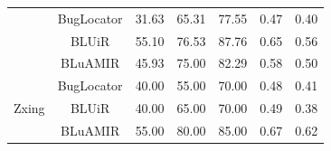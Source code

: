 \documentclass[conference]{IEEEtran}
\begin{document}
\begin{table}[htbp]
{\begin{tabular}{c|c|c|c|c|c|c}
			       & BugLocator & 31.63 & 65.31 & 77.55 & 0.47 & 0.40 \\  \cline{2-7} 
			       & BLUiR & 55.10 & 76.53 & 87.76 & 0.65  & 0.56 \\  \cline{2-7} &BLuAMIR                                                                     & 45.93                                               & 75.00                                              & 82.29                                             &   0.58  &   0.50  \\ \hline \hline
			\multirow{4}{*}{Zxing}                  
			
			
			 & BugLocator & 40.00 & 55.00 & 70.00 & 0.48 & 0.41 \\  \cline{2-7}  
			 & BLUiR & 40.00 & 65.00 & 70.00 & 0.49  & 0.38 \\  \cline{2-7}
			  &BLuAMIR                                                                  & 55.00                                            & 80.00                                           & 85.00                                             &   0.67  &  0.62   \\ \hline
			
			
			
			
	\end{tabular}}
	\centering
\end{table}
\end{document}
